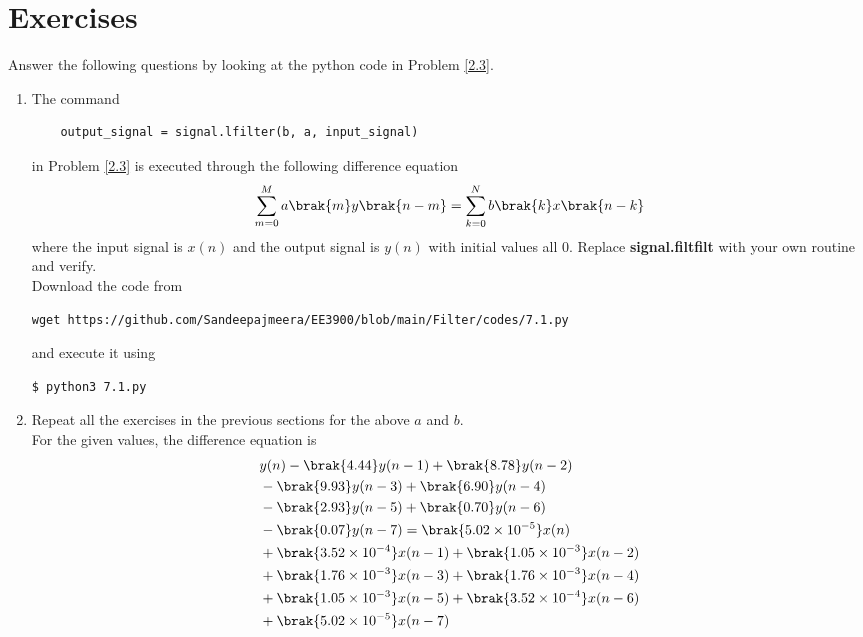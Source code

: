 \documentclass[journal,12pt,twocolumn]{IEEEtran}
\renewcommand\thesection{\arabic{section}}
\begin{document}
\section{Exercises}
Answer the following questions by looking at the python code in Problem \ref{2.3}.
\begin{enumerate}[label=\thesection.\arabic*]
\item
The command
\begin{lstlisting}
	output_signal = signal.lfilter(b, a, input_signal)
	\end{lstlisting}
in Problem \ref{2.3} is executed through the following difference equation
\begin{equation}
\label{eq:iir_filter_gen}
 \sum _{m=0}^{M}a\brak{m}y\brak{n-m}=\sum _{k=0}^{N}b\brak{k}x\brak{n-k}
\end{equation}
%
where the input signal is $x(n)$ and the output signal is $y(n)$ with initial values all 0. Replace
\textbf{signal.filtfilt} with your own routine and verify.\\
\solution Download the code from
\begin{lstlisting}
wget https://github.com/Sandeepajmeera/EE3900/blob/main/Filter/codes/7.1.py
\end{lstlisting}
and execute it using
\begin{lstlisting}
$ python3 7.1.py
\end{lstlisting}
%
\item Repeat all the exercises in the previous sections for the above $a$ and $b$.\\
\solution For the given values, the difference equation is
\begin{align}
	&y(n) - \brak{4.44}y(n - 1) + \brak{8.78}y(n - 2) \nonumber \\
	&- \brak{9.93}y(n - 3) + \brak{6.90}y(n - 4) \nonumber \\
	&- \brak{2.93}y(n - 5) \nonumber + \brak{0.70}y(n - 6) \nonumber \\
	&- \brak{0.07}y(n - 7) = \brak{5.02 \times 10^{-5}}x(n) \nonumber \\
	&+ \brak{3.52 \times 10^{-4}}x(n - 1) + \brak{1.05 \times 10^{-3}}x(n - 2) \nonumber \\
	&+ \brak{1.76 \times 10^{-3}}x(n - 3) + \brak{1.76 \times 10^{-3}}x(n - 4) \nonumber \\
	&+ \brak{1.05 \times 10^{-3}}x(n - 5) + \brak{3.52 \times 10^{-4}}x(n - 6) \nonumber \\
	&+ \brak{5.02 \times 10^{-5}}x(n - 7)
\end{align}

\end{enumerate}
\end{document}
